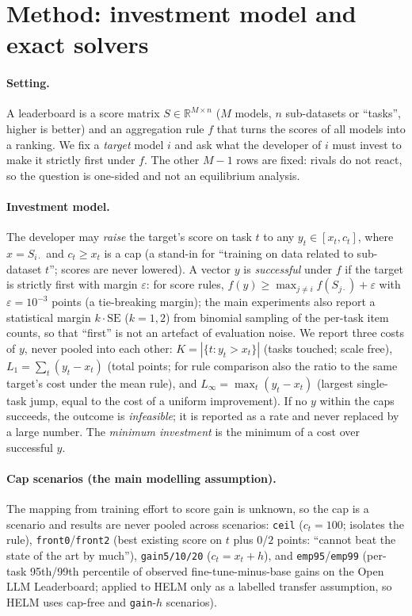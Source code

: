 \section{Method: investment model and exact solvers}
\label{sec:method}

\paragraph{Setting.}
A leaderboard is a score matrix $S\in\mathbb{R}^{M\times n}$ ($M$ models, $n$ sub-datasets or ``tasks'', higher is better) and an aggregation rule $f$ that turns the scores of all models into a ranking. We fix a \emph{target} model $i$ and ask what the developer of $i$ must invest to make it strictly first under $f$. The other $M-1$ rows are fixed: rivals do not react, so the question is one-sided and not an equilibrium analysis.

\paragraph{Investment model.}
The developer may \emph{raise} the target's score on task $t$ to any $y_t\in[x_t,c_t]$, where $x=S_{i\cdot}$ and $c_t\ge x_t$ is a cap (a stand-in for ``training on data related to sub-dataset $t$''; scores are never lowered). A vector $y$ is \emph{successful} under $f$ if the target is strictly first with margin $\varepsilon$: for score rules, $f(y)\ge \max_{j\ne i}f(S_{j\cdot})+\varepsilon$ with $\varepsilon=10^{-3}$ points (a tie-breaking margin); the main experiments also report a statistical margin $k\cdot\mathrm{SE}$ ($k=1,2$) from binomial sampling of the per-task item counts, so that ``first'' is not an artefact of evaluation noise. We report three costs of $y$, never pooled into each other: $K=|\{t:y_t>x_t\}|$ (tasks touched; scale free), $L_1=\sum_t(y_t-x_t)$ (total points; for rule comparison also the ratio to the same target's cost under the mean rule), and $L_\infty=\max_t(y_t-x_t)$ (largest single-task jump, equal to the cost of a uniform improvement). If no $y$ within the caps succeeds, the outcome is \emph{infeasible}; it is reported as a rate and never replaced by a large number. The \emph{minimum investment} is the minimum of a cost over successful $y$.

\paragraph{Cap scenarios (the main modelling assumption).}
The mapping from training effort to score gain is unknown, so the cap is a scenario and results are never pooled across scenarios: \texttt{ceil} ($c_t=100$; isolates the rule), \texttt{front0}/\texttt{front2} (best existing score on $t$ plus $0$/$2$ points: ``cannot beat the state of the art by much''), \texttt{gain5/10/20} ($c_t=x_t+h$), and \texttt{emp95}/\texttt{emp99} (per-task 95th/99th percentile of observed fine-tune-minus-base gains on the Open LLM Leaderboard; applied to HELM only as a labelled transfer assumption, so HELM uses cap-free and \texttt{gain}-$h$ scenarios).

